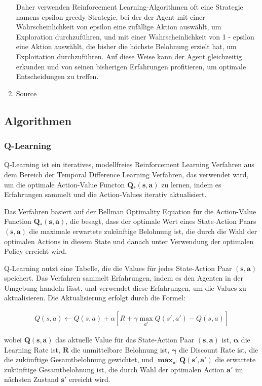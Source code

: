 \begin{enumerate}
    Daher verwenden Reinforcement Learning-Algorithmen oft eine Strategie namens epsilon-greedy-Strategie, bei der der Agent mit einer Wahrscheinlichkeit von epsilon eine zufällige Aktion auswählt, um Exploration durchzuführen, und mit einer Wahrscheinlichkeit von 1 - epsilon eine Aktion auswählt, die bisher die höchste Belohnung erzielt hat, um Exploitation durchzuführen. Auf diese Weise kann der Agent gleichzeitig erkunden und von seinen bisherigen Erfahrungen profitieren, um optimale Entscheidungen zu treffen.
    \item \href{https://blog.floydhub.com/an-introduction-to-q-learning-reinforcement-learning/}{Source} 
\end{enumerate}

\subsection{Algorithmen}

\subsubsection{Q-Learning}

Q-Learning ist ein iteratives, modellfreies Reinforcement Learning Verfahren aus dem Bereich der Temporal Difference Learning Verfahren, das verwendet wird, um die optimale Action-Value Functon $\bm{Q_{*}(s,a)}$ zu lernen, indem es Erfahrungen sammelt und die Action-Values iterativ aktualisiert.

Das Verfahren basiert auf der Bellman Optimality Equation für die Action-Value Function $\bm{Q_{*}(s,a)}$, die besagt, dass der optimale Wert eines State-Action Paars $\bm{(s,a)}$ die maximale erwartete zukünftige Belohnung ist, die durch die Wahl der optimalen Actions in diesem State und danach unter Verwendung der optimalen Policy erreicht wird.

Q-Learning nutzt eine Tabelle, die die Values für jedes State-Action Paar $\bm{(s,a)}$ speichert. Das Verfahren sammelt Erfahrungen, indem es den Agenten in der Umgebung handeln lässt, und verwendet diese Erfahrungen, um die Values zu aktualisieren. Die Aktualisierung erfolgt durch die Formel:


\begin{align}
    Q(s,a) \leftarrow Q(s,a) + \alpha [R + \gamma \max_{a'} Q(s',a') - Q(s,a)]
\end{align}


wobei $\bm{Q(s,a)}$ das aktuelle Value für das State-Action Paar $\bm{(s,a)}$ ist, $\bm\alpha$ die Learning Rate ist, $\bm{R}$ die unmittelbare Belohnung ist, $\bm\gamma$ die Discount Rate ist, die die zukünftige Gesamtbelohnung gewichtet, und $\bm{\max_{a'} Q(s',a')}$ die erwartete zukünftige Gesamtbelohnung ist, die durch Wahl der optimalen Action $\bm{a'}$ im nächsten Zustand $\bm{s'}$ erreicht wird.

